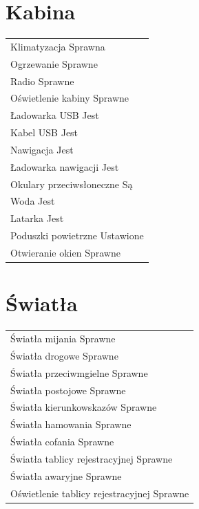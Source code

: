 \documentclass{article}
\begin{document}
\begin{multicols}{2}
\section{Kabina}
\begin{tabularx}{\columnwidth}{|X|}
\hline
Klimatyzacja \dotfill Sprawna \\
Ogrzewanie \dotfill Sprawne \\
Radio \dotfill Sprawne \\
Oświetlenie kabiny \dotfill Sprawne \\
Ładowarka USB \dotfill Jest \\
Kabel USB \dotfill Jest \\
Nawigacja \dotfill Jest \\
Ładowarka nawigacji \dotfill Jest \\
Okulary przeciwsłoneczne \dotfill Są \\
Woda \dotfill Jest \\
Latarka \dotfill Jest \\
Poduszki powietrzne \dotfill Ustawione \\
Otwieranie okien \dotfill Sprawne \\
\hline
\end{tabularx}


\section{Światła}
\begin{tabularx}{\columnwidth}{|X|}
\hline
Światła mijania \dotfill Sprawne \\
Światła drogowe \dotfill Sprawne \\
Światła przeciwmgielne \dotfill Sprawne \\
Światła postojowe \dotfill Sprawne \\
Światła kierunkowskazów \dotfill Sprawne \\
Światła hamowania \dotfill Sprawne \\
Światła cofania \dotfill Sprawne \\
Światła tablicy rejestracyjnej \dotfill Sprawne \\
Światła awaryjne \dotfill Sprawne \\
Oświetlenie tablicy rejestracyjnej \dotfill Sprawne \\
\hline
\end{tabularx}


\end{multicols}
\end{document}
